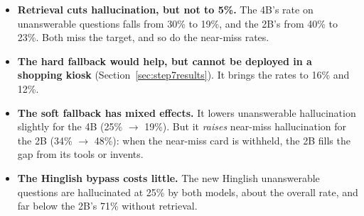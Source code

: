 \documentclass[11pt,a4paper]{article}
\begin{document}
\begin{table}[H]
\centering
\small
{}
\caption{Judged hallucination (share labelled ``unsupported''). Unanswerable: $n = 57$ (33 original and 24 new
Hinglish); near miss: $n = 58$. Target: $\le$5\%.}
\label{tab:halluc}
\end{table}

\begin{itemize}
  \item \textbf{Retrieval cuts hallucination, but not to 5\%.} The 4B's rate on unanswerable questions falls from 30\%
        to 19\%, and the 2B's from 40\% to 23\%. Both miss the target, and so do the near-miss rates.
  \item \textbf{The hard fallback would help, but cannot be deployed in a shopping kiosk} (Section~\ref{sec:step7results}).
        It brings the rates to 16\% and 12\%.
  \item \textbf{The soft fallback has mixed effects.} It lowers unanswerable hallucination slightly for the 4B (25\%
        $\rightarrow$ 19\%). But it \emph{raises} near-miss hallucination for the 2B (34\% $\rightarrow$ 48\%):
        when the near-miss card is withheld, the 2B fills the gap from its tools or invents.
  \item \textbf{The Hinglish bypass costs little.} The new Hinglish unanswerable questions are hallucinated at 25\% by
        both models, about the overall rate, and far below the 2B's 71\% without retrieval.
\end{itemize}
\end{document}
